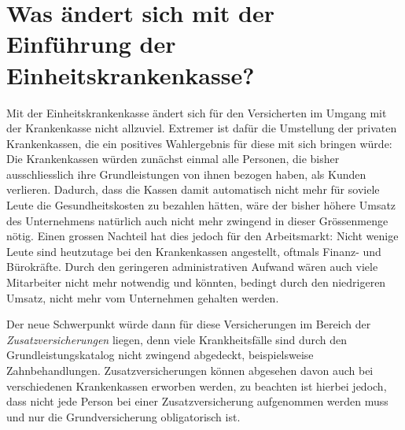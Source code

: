 \documentclass[a4paper,12pt]{book}
\begin{document}
\section{Was ändert sich mit der Einführung der Einheitskrankenkasse?}
Mit der Einheitskrankenkasse ändert sich für den Versicherten im Umgang mit der Krankenkasse nicht allzuviel. Extremer ist dafür die Umstellung der privaten Krankenkassen, die ein positives Wahlergebnis für diese mit sich bringen würde:\\
Die Krankenkassen würden zunächst einmal alle Personen, die bisher ausschliesslich ihre Grundleistungen von ihnen bezogen haben, als Kunden verlieren. Dadurch, dass die Kassen damit automatisch nicht mehr für soviele Leute die Gesundheitskosten zu bezahlen hätten, wäre der bisher höhere Umsatz des Unternehmens natürlich auch nicht mehr zwingend in dieser Grössenmenge nötig. Einen grossen Nachteil hat dies jedoch für den Arbeitsmarkt: Nicht wenige Leute sind heutzutage bei den Krankenkassen angestellt, oftmals Finanz- und Bürokräfte. Durch den geringeren administrativen Aufwand wären auch viele Mitarbeiter nicht mehr notwendig und könnten, bedingt durch den niedrigeren Umsatz, nicht mehr vom Unternehmen gehalten werden.\newline

Der neue Schwerpunkt würde dann für diese Versicherungen im Bereich der \emph{Zusatzversicherungen} liegen, denn viele Krankheitsfälle sind durch den Grundleistungskatalog nicht zwingend abgedeckt, beispielsweise Zahnbehandlungen. Zusatzversicherungen können abgesehen davon auch bei verschiedenen Krankenkassen erworben werden, zu beachten ist hierbei jedoch, dass nicht jede Person  bei einer Zusatzversicherung aufgenommen werden muss und nur die Grundversicherung obligatorisch ist.
\end{document}
